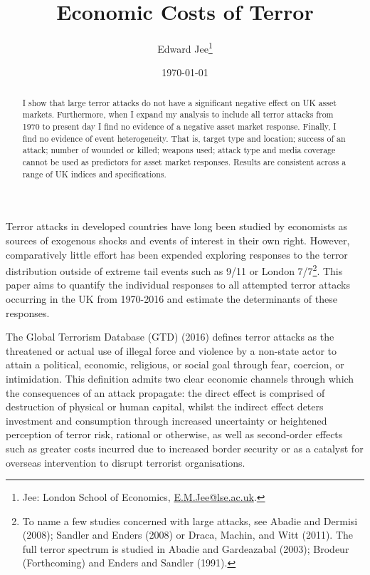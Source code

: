 \documentclass[]{AEA}
\begin{document}
\title{Economic Costs of Terror}


\author{
  Edward Jee\thanks{
  Jee: London School of Economics, \href{mailto:E.M.Jee@lse.ac.uk}{E.M.Jee@lse.ac.uk}.
}
}

\date{\today}

\begin{abstract}
I show that large terror attacks do not have a significant negative
effect on UK asset markets. Furthermore, when I expand my analysis to
include all terror attacks from 1970 to present day I find no evidence
of a negative asset market response. Finally, I find no evidence of
event heterogeneity. That is, target type and location; success of an
attack; number of wounded or killed; weapons used; attack type and media
coverage cannot be used as predictors for asset market responses.
Results are consistent across a range of UK indices and specifications.
\end{abstract}


\maketitle

\pagestyle{plain}

Terror attacks in developed countries have long been studied by
economists as sources of exogenous shocks and events of interest in
their own right. However, comparatively little effort has been expended
exploring responses to the terror distribution outside of extreme tail
events such as 9/11 or London 7/7\footnote{To name a few studies
  concerned with large attacks, see Abadie and Dermisi (2008); Sandler
  and Enders (2008) or Draca, Machin, and Witt (2011). The full terror
  spectrum is studied in Abadie and Gardeazabal (2003); Brodeur
  (Forthcoming) and Enders and Sandler (1991).}. This paper aims to
quantify the individual responses to all attempted terror attacks
occurring in the UK from 1970-2016 and estimate the determinants of
these responses.

The Global Terrorism Database (GTD) (2016) defines terror attacks as the
threatened or actual use of illegal force and violence by a non-state
actor to attain a political, economic, religious, or social goal through
fear, coercion, or intimidation. This definition admits two clear
economic channels through which the consequences of an attack propagate:
the direct effect is comprised of destruction of physical or human
capital, whilst the indirect effect deters investment and consumption
through increased uncertainty or heightened perception of terror risk,
rational or otherwise, as well as second-order effects such as greater
costs incurred due to increased border security or as a catalyst for
overseas intervention to disrupt terrorist organisations.
\end{document}
